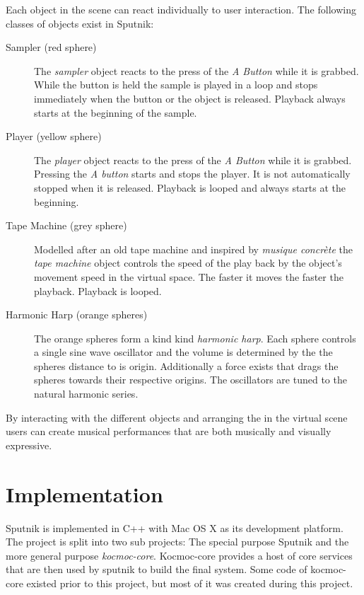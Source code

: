 \documentclass[10pt,a4paper]{scrartcl}
\begin{document}
Each object in the scene can react individually to user interaction. The following classes of objects exist in Sputnik:
\begin{description}
\item[Sampler (red sphere)] The \emph{sampler} object reacts to the press of the \emph{A Button} while it is grabbed. While the button is held the sample is played in a loop and stops immediately when the button or the object is released. Playback always starts at the beginning of the sample.

\item[Player (yellow sphere)] The \emph{player} object reacts to the press of the \emph{A Button} while it is grabbed. Pressing the \emph{A button} starts and stops the player. It is not automatically stopped when it is released. Playback is looped and always starts at the beginning.

\item[Tape Machine (grey sphere)] Modelled after an old tape machine and inspired by \emph{musique concrète} the \emph{tape machine} object controls the speed of the play back by the object's movement speed in the virtual space. The faster it moves the faster the playback. Playback is looped.

\item[Harmonic Harp (orange spheres)] The orange spheres form a kind kind \emph{harmonic harp}. Each sphere controls a single sine wave oscillator and the volume is determined by the the spheres distance to is origin. Additionally a force exists that drags the spheres towards their respective origins. The oscillators are tuned to the natural harmonic series.
\end{description}

By interacting with the different objects and arranging the in the virtual scene users can create musical performances that are both musically and visually expressive.




\section{Implementation}
Sputnik is implemented in C++ with Mac OS X as its development platform. The project is split into two sub projects: The special purpose Sputnik and the more general purpose \emph{kocmoc-core}. Kocmoc-core provides a host of core services that are then used by sputnik to build the final system. Some code of kocmoc-core existed prior to this project, but most of it was created during this project. 
\end{document}
